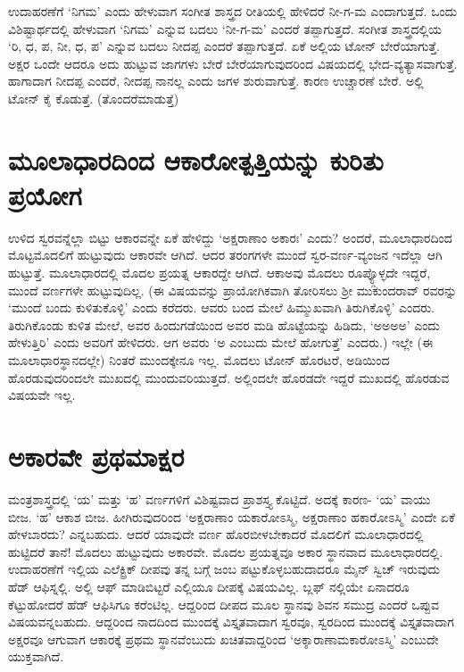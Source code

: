 ಉದಾಹರಣೆಗೆ `ನಿಗಮ' ಎಂದು ಹೇಳುವಾಗ ಸಂಗೀತ ಶಾಸ್ತ್ರದ ರೀತಿಯಲ್ಲಿ ಹೇಳಿದರೆ ನೀ-ಗ-ಮ ಎಂದಾಗುತ್ತದೆ. ಒಂದು ವಿಶಿಷ್ಟಾರ್ಥದಲ್ಲಿ ಹೇಳುವಾಗ `ನಿಗಮ' ಎನ್ನುವ ಬದಲು `ನೀ-ಗ-ಮ' ಎಂದರೆ ತಪ್ಪಾಗುತ್ತದೆ. ಸಂಗೀತ ಶಾಸ್ತ್ರದಲ್ಲಿಯ `ರಿ, ಧ, ಪ, ನೀ, ಧ, ಪ' ಎನ್ನುವ ಬದಲು ನೀದಪ್ಪ ಎಂದರೆ ತಪ್ಪಾಗುತ್ತದೆ. ಏಕೆ ಅಲ್ಲಿಯ ಟೋನ್ ಬೇರೆಯಾಗುತ್ತೆ. ಅಕ್ಷರ ಒಂದೇ ಆದರೂ ಅದು ಹುಟ್ಟುವ ಜಾಗಗಳು ಬೇರೆ ಬೇರೆಯಾಗುವುದರಿಂದ ವಿಷಯದಲ್ಲಿ ಭೇದ-ವ್ಯತ್ಯಾಸವಾಗುತ್ತೆ. ಹಾಗಾದಾಗ ನೀದಪ್ಪ ಎಂದರೆ, ನೀದಪ್ಪ ನಾನಲ್ಲ ಎಂದು ಜಗಳ ಶುರುವಾಗುತ್ತೆ. ಕಾರಣ ಉಚ್ಚಾರಣೆ ಬೇರೆ. ಅಲ್ಲಿ ಟೋನ್ ಕೈ ಕೊಡುತ್ತೆ. (ತೊಂದರೆಮಾಡುತ್ತೆ)

\section*{ಮೂಲಾಧಾರದಿಂದ ಆಕಾರೋತ್ಪತ್ತಿಯನ್ನು ಕುರಿತು ಪ್ರಯೋಗ} 

ಉಳಿದ ಸ್ವರವನ್ನೆಲ್ಲಾ ಬಿಟ್ಟು ಆಕಾರವನ್ನೇ ಏಕೆ ಹೇಳಿದ್ದು `ಅಕ್ಷರಾಣಾಂ ಅಕಾರಃ' ಎಂದು? ಅಂದರೆ, ಮೂಲಾಧಾರದಿಂದ ಮೊಟ್ಟಮೊದಲಿಗೆ ಹುಟ್ಟುವುದು ಆಕಾರವೇ ಆಗಿದೆ. ಆದರ ತರಂಗಗಳೇ ಮುಂದೆ ಸ್ವರ-ವರ್ಣ-ವ್ಯಂಜನ ಇದೆಲ್ಲಾ ಆಗಿ ಹುಟ್ಟುತ್ತೆ. ಮೂಲಾಧಾರದಲ್ಲಿ ಮೊದಲ ಪ್ರಯತ್ನ ಆಕಾರದ್ದೇ ಆಗಿದೆ. ಆಕಾಅವು ಮೊದಲು ರೂಪ್ಯ್ಗೊಳ್ಳದೇ ಇದ್ದರೆ, ಮುಂದೆ ವರ್ಣಗಳೇ ಹುಟ್ಟುವುದಿಲ್ಲ. (ಈ ವಿಷಯವನ್ನು ಪ್ರಾಯೋಗಿಕವಾಗಿ ತೋರಿಸಲು ಶ್ರೀ ಮುಕುಂದರಾವ್ ರವರನ್ನು `ಮುಂದೆ ಬಂದು ಕುಳಿತುಕೊಳ್ಳಿ' ಎಂದು ಕರೆದರು. ಆವರು ಬಂದ ಮೇಲೆ ಹಿಮ್ಮುಖವಾಗಿ ತಿರುಗಿಕೊಳ್ಳಿ' ಎಂದರು. ತಿರುಗಿಕೊಂಡು ಕುಳಿತ ಮೇಲೆ, ಅವರ ಹಿಂದುಗಡೆಯಿಂದ ಅವರ ಮಡಿ ಹೊಟ್ಟೆಯನ್ನು ಹಿಡಿದು, `ಅ‌ಅಅ‌ಅ' ಎಂದು ಹೇಳುತ್ತಿರಿ' ಎಂದು ಅವರಿಗೆ ಹೇಳಿದರು. ಆಗ ಅವರು `ಅ ಎಂಬುದು ಮೇಲೆ ಹೋಗುತ್ತೆ' ಎಂದರು.) ಇಲ್ಲೇ (ಈ ಮೂಲಾಧಾರಸ್ಥಾನದಲ್ಲೇ) ನಿಂತರೆ ಮುಂದಕ್ಕೇನೂ ಇಲ್ಲ. ಮೊದಲು ಟೋನ್ ಹೊರಟರೆ, ಅಡಿಯಿಂದ ಹೊರಡುವುದರಿಂದಲೇ ಮುಖದಲ್ಲಿ ಮುಂದುವರಿಯುತ್ತದೆ. ಅಲ್ಲಿಂದಲೇ ಹೊರಡದೇ ಇದ್ದರೆ ಮುಖದಲ್ಲಿ ಹೊರಡುವ ವಿಷಯವೇ ಇಲ್ಲ.

\section*{ಅಕಾರವೇ ಪ್ರಥಮಾಕ್ಷರ}

ಮಂತ್ರಶಾಸ್ತ್ರದಲ್ಲಿ `ಯ' ಮತ್ತು `ಹ' ವರ್ಣಗಳಿಗೆ ವಿಶಿಷ್ಟವಾದ ಪ್ರಾಶಸ್ತ್ಯ ಕೊಟ್ಟಿದೆ. ಅದಕ್ಕೆ ಕಾರಣ- `ಯ' ವಾಯು ಬೀಜ. `ಹ' ಆಕಾಶ ಬೀಜ. ಹೀಗಿರುವುದರಿಂದ `ಅಕ್ಷರಾಣಾಂ ಯಕಾರೋಽಸ್ಮಿ, ಅಕ್ಷರಾಣಾಂ ಹಕಾರೋಽಸ್ಮಿ' ಎಂದೇ ಏಕೆ ಹೇಳಬಾರದು? ಎನ್ನಬಹುದು. ಆದರೆ ಯಾವುದೇ ವರ್ಣ ಹೊರಬೀಳಬೇಕಾದರೆ ಮೊದಲಿಗೆ ಮೂಲಾಧಾರದಲ್ಲಿ ಹುಟ್ಟಿದರೆ ತಾನೆ! ಮೊದಲು ಹುಟ್ಟುವುದು ಅಕಾರವೇ. ಮೊದಲ ಪ್ರಯತ್ನವೂ ಅಕಾರ ಸ್ಥಾನವಾದ ಮೂಲಾಧಾರದಲ್ಲಿ. ಉದಾಹರಣೆಗೆ ಇಲ್ಲಿಯ ಎಲೆಕ್ಟ್ರಿಕ್ ದೀಪವು ತನ್ನ ಬಗ್ಗೆ ಜಂಬ ಪಟ್ಟುಕೊಳ್ಳಬಹುದಾದರೂ ಮೈನ್ ಸ್ವಿಚ್ ಇರುವುದು ಹೆಡ್ ಆಫಿಸ್ನಲ್ಲಿ. ಅಲ್ಲಿ ಆಫ್ ಮಾಡಿಬಿಟ್ಟರೆ ಎಲ್ಲಿಯೂ ದೀಪಕ್ಕೆ ವಿಷಯವಿಲ್ಲ. ಬ್ಲಫ್ ನಲ್ಲಿಯೇ ಏನಾದರೂ ಕೆಟ್ಟುಹೋದರೆ ಹೆಡ್ ಆಫಿಸಿಗೂ ಕರೆಂಟಿಲ್ಲ. ಆದ್ದರಿಂದ ದೀಪದ ಮೂಲ ಸ್ಥಾನವು ಶಿವನ ಸಮುದ್ರ ಎಂದರೆ ಒಪ್ಪುವ ವಿಷಯವನ್ನಬಹುದು. ಆದ್ದರಿಂದ ನಾದದಿಂದ ಮುಂದಕ್ಕೆ ವಿಸ್ತೃತವಾದಾಗ ಸ್ವರವೂ, ಸ್ವರದಿಂದ ಮುಂದಕ್ಕೆ ವಿಸ್ತೃತವಾದಾಗ ಅಕ್ಷರವೂ ಆಗುವಾಗ ಆಕಾರಕ್ಕೆ ಪ್ರಥಮ ಸ್ಥಾನವೆಂಬುದು ಖಚಿತವಾದ್ದರಿಂದ `ಅಕ್ಶಾರಾಣಾಮಕಾರೋಽಸ್ಮಿ'\label{97} ಎಂಬುದೇ ಯುಕ್ತವಾಗಿದೆ.

